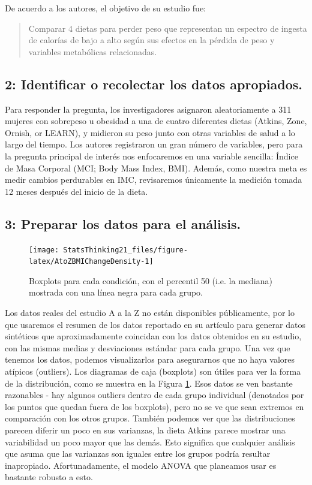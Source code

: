 \documentclass[
  12pt,
]{book}
\theoremstyle{definition}
\theoremstyle{definition}
\theoremstyle{definition}
\theoremstyle{remark}
\begin{document}
De acuerdo a los autores, el objetivo de su estudio fue:

\begin{quote}
Comparar 4 dietas para perder peso que representan un espectro de ingesta de calorías de bajo a alto según sus efectos en la pérdida de peso y variables metabólicas relacionadas.
\end{quote}

\hypertarget{identificar-o-recolectar-los-datos-apropiados.}{%
\subsection{2: Identificar o recolectar los datos apropiados.}\label{identificar-o-recolectar-los-datos-apropiados.}}

Para responder la pregunta, los investigadores asignaron aleatoriamente a 311 mujeres con sobrepeso u obesidad a una de cuatro diferentes dietas (Atkins, Zone, Ornish, or LEARN), y midieron su peso junto con otras variables de salud a lo largo del tiempo. Los autores registraron un gran número de variables, pero para la pregunta principal de interés nos enfocaremos en una variable sencilla: Índice de Masa Corporal (MCI; Body Mass Index, BMI). Además, como nuestra meta es medir cambios perdurables en IMC, revisaremos únicamente la medición tomada 12 meses después del inicio de la dieta.

\hypertarget{preparar-los-datos-para-el-anuxe1lisis.}{%
\subsection{3: Preparar los datos para el análisis.}\label{preparar-los-datos-para-el-anuxe1lisis.}}

\begin{figure}
\texttt{[image: StatsThinking21\_files/figure-latex/AtoZBMIChangeDensity-1]} \caption{Boxplots para cada condición, con el percentil 50 (i.e. la mediana) mostrada con una línea negra para cada grupo.}\label{fig:AtoZBMIChangeDensity}
\end{figure}

Los datos reales del estudio A a la Z no están disponibles públicamente, por lo que usaremos el resumen de los datos reportado en su artículo para generar datos sintéticos que aproximadamente coincidan con los datos obtenidos en su estudio, con las mismas medias y desviaciones estándar para cada grupo. Una vez que tenemos los datos, podemos visualizarlos para asegurarnos que no haya valores atípicos (outliers). Los diagramas de caja (boxplots) son útiles para ver la forma de la distribución, como se muestra en la Figura \ref{fig:AtoZBMIChangeDensity}. Esos datos se ven bastante razonables - hay algunos outliers dentro de cada grupo individual (denotados por los puntos que quedan fuera de los boxplots), pero no se ve que sean extremos en comparación con los otros grupos. También podemos ver que las distribuciones parecen diferir un poco en sus varianzas, la dieta Atkins parece mostrar una variabilidad un poco mayor que las demás. Esto significa que cualquier análisis que asuma que las varianzas son iguales entre los grupos podría resultar inapropiado. Afortunadamente, el modelo ANOVA que planeamos usar es bastante robusto a esto.
\end{document}
